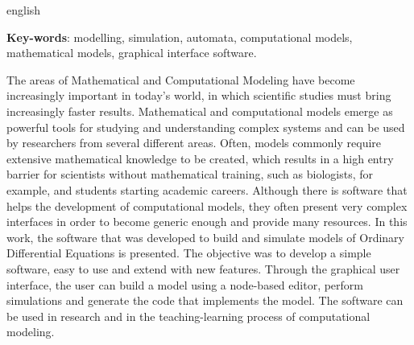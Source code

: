 \begin{resumo}[Abstract]
	\begin{otherlanguage*}{english}
    
    
		\vspace{\onelineskip}
		
		\noindent 
		\textbf{Key-words}: modelling, simulation, automata, computational models, mathematical models, graphical interface software.
		
		The areas of Mathematical and Computational Modeling have become increasingly important in today's world, in which scientific studies must bring increasingly faster results. Mathematical and computational models emerge as powerful tools for studying and understanding complex systems and can be used by researchers from several different areas. Often, models commonly require extensive mathematical knowledge to be created, which results in a high entry barrier for scientists without mathematical training, such as biologists, for example, and students starting academic careers. Although there is software that helps the development of computational models, they often present very complex interfaces in order to become generic enough and provide many resources. In this work, the software that was developed to build and simulate models of Ordinary Differential Equations is presented. The objective was to develop a simple software, easy to use and extend with new features. Through the graphical user interface, the user can build a model using a node-based editor, perform simulations and generate the code that implements the model. The software can be used in research and in the teaching-learning process of computational modeling.
	\end{otherlanguage*}
\end{resumo}
